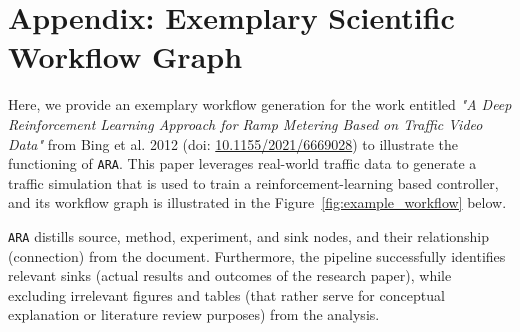 \documentclass{article}
\begin{document}
\newpage

% 




\clearpage
\appendix





\clearpage
\section{Appendix: Exemplary Scientific Workflow Graph} \label{appendix:ex_workflow}

Here, we provide an exemplary workflow generation for the work entitled \textit{"A Deep Reinforcement Learning Approach for Ramp Metering Based on Traffic Video Data"} from Bing et al. 2012 (doi: \href{https://doi.org/10.1155/2021/6669028}{10.1155/2021/6669028}) to illustrate the functioning of \texttt{ARA}.
This paper leverages real-world traffic data to generate a traffic simulation that is used to train a reinforcement-learning based controller, and its workflow graph is illustrated in the Figure~\ref{fig:example_workflow} below.

\texttt{ARA} distills source, method, experiment, and sink nodes, and their relationship (connection) from the document. 
Furthermore, the pipeline successfully identifies relevant sinks (actual results and outcomes of the research paper), while excluding irrelevant figures and tables (that rather serve for conceptual explanation or literature review purposes) from the analysis.
\end{document}
